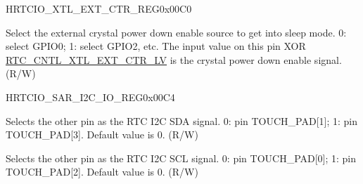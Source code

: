 \begin{register}{H}{RTCIO\_XTL\_EXT\_CTR\_REG}{0x00C0}\label{regdesc:RTCIOXTLEXTCTRREG}
%
%
\regnewline%
\begin{regdesc}\begin{reglist}
\item [RTCIO\_XTL\_EXT\_CTR\_SEL]Select the external crystal power down enable source to get into sleep mode. 0: select GPIO0; 1: select GPIO2, etc. The input value on this pin XOR \hyperref[regdesc:RTCCNTLXTEXTCTRLV]{RTC\_CNTL\_XTL\_EXT\_CTR\_LV} is the crystal power down enable signal. (R/W)
\end{reglist}\end{regdesc}
\end{register}


\begin{register}{H}{RTCIO\_SAR\_I2C\_IO\_REG}{0x00C4}\label{regdesc:RTCIOSARI2CIOREG}
%
%
%
\regnewline%
\begin{regdesc}\begin{reglist}
\item [RTCIO\_SAR\_I2C\_SDA\_SEL]Selects the other pin as the RTC I2C SDA signal. 0: pin TOUCH\_PAD[1]; 1: pin TOUCH\_PAD[3]. Default value is 0. (R/W)
\item [RTCIO\_SAR\_I2C\_SCL\_SEL]Selects the other pin as the RTC I2C SCL signal. 0: pin TOUCH\_PAD[0]; 1: pin TOUCH\_PAD[2]. Default value is 0. (R/W)
\end{reglist}\end{regdesc}
\end{register}
